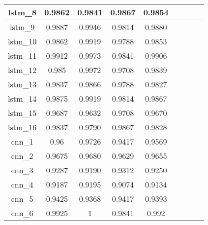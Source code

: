 \begin{table}[p]
\begin{tabular} {|c|c|c|c|c|c|c|c|c| }
        lstm\_8  & 0.9862                       & 0.9841                & \cellcolor{green!50}0.9867 & 0.9854                    \\ \hline
        lstm\_9  & 0.9887                       & 0.9946                & 0.9814                     & 0.9880                    \\ \hline
        lstm\_10 & 0.9862                       & 0.9919                & 0.9788                     & 0.9853                    \\ \hline
        lstm\_11 & 0.9912                       & 0.9973                & 0.9841                     & 0.9906                    \\ \hline
        lstm\_12 & 0.985                        & 0.9972                & 0.9708                     & 0.9839                    \\ \hline
        lstm\_13 & 0.9837                       & 0.9866                & 0.9788                     & 0.9827                    \\ \hline
        lstm\_14 & 0.9875                       & 0.9919                & 0.9814                     & 0.9867                    \\ \hline
        lstm\_15 & 0.9687                       & 0.9632                & 0.9708                     & 0.9670                    \\ \hline
        lstm\_16 & 0.9837                       & 0.9790                & 0.9867                     & 0.9828                    \\ \hline
        cnn\_1   & 0.96                         & 0.9726                & 0.9417                     & 0.9569                    \\ \hline
        cnn\_2   & 0.9675                       & 0.9680                & 0.9629                     & 0.9655                    \\ \hline
        cnn\_3   & 0.9287                       & 0.9190                & 0.9312                     & 0.9250                    \\ \hline
        cnn\_4   & 0.9187                       & 0.9195                & 0.9074                     & 0.9134                    \\ \hline
        cnn\_5   & 0.9425                       & 0.9368                & 0.9417                     & 0.9393                    \\ \hline
        cnn\_6   & \cellcolor{green!50}0.9925   & \cellcolor{green!50}1 & 0.9841                     & \cellcolor{green!50}0.992 \\ \hline

\end{tabular}
\end{table}
